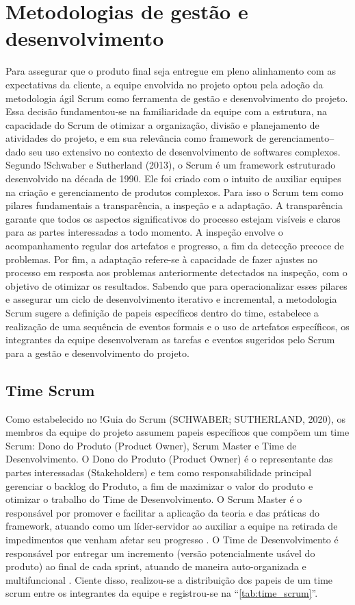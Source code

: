 \documentclass[
	12pt,				%
	openany,			%
	twoside,			%
	a4paper,			%
	english,			%
	french,				%
	spanish,			%
	brazil				%
	]{abntex2}
\begin{document}
\section{Metodologias de gestão e desenvolvimento}
Para assegurar que o produto final seja entregue em pleno alinhamento com as expectativas da cliente, a equipe envolvida no projeto optou pela adoção da metodologia ágil Scrum como ferramenta de gestão e desenvolvimento do projeto. Essa decisão fundamentou-se na familiaridade da equipe com a estrutura, na capacidade do Scrum de otimizar a organização, divisão e planejamento de atividades do projeto, e em sua relevância como framework de gerenciamento– dado seu uso extensivo no contexto de desenvolvimento de softwares complexos.
Segundo !Schwaber e Sutherland (2013), o Scrum é um framework estruturado desenvolvido na década de 1990. Ele foi criado com o intuito de auxiliar equipes na criação e gerenciamento de produtos complexos. Para isso o Scrum tem como pilares fundamentais a transparência, a inspeção e a adaptação. A transparência garante que todos os aspectos significativos do processo estejam visíveis e claros para as partes interessadas a todo momento. A inspeção envolve o acompanhamento regular dos artefatos e progresso, a fim da detecção precoce de problemas. Por fim, a adaptação refere-se à capacidade de fazer ajustes no processo  em resposta aos problemas anteriormente detectados na inspeção, com o objetivo de otimizar os resultados.
Sabendo que para operacionalizar esses pilares e assegurar um ciclo de desenvolvimento iterativo e incremental, a metodologia Scrum sugere a definição de papeis específicos dentro do time, estabelece a realização de uma sequência de eventos formais e o uso de artefatos específicos, os integrantes da equipe desenvolveram as tarefas e eventos sugeridos pelo Scrum para a gestão e desenvolvimento do projeto.

\subsection{Time Scrum}
Como estabelecido no !Guia do Scrum (SCHWABER; SUTHERLAND, 2020), os membros da equipe do projeto assumem papeis específicos que compõem um time Scrum: Dono do Produto (Product Owner), Scrum Master e Time de Desenvolvimento. 
O Dono do Produto (Product Owner) é o representante das partes interessadas (Stakeholders) e tem como responsabilidade principal gerenciar o backlog do Produto, a fim de maximizar o valor do produto e otimizar o trabalho do Time de Desenvolvimento. 
O Scrum Master é o responsável por promover e facilitar a aplicação da teoria e das práticas do framework, atuando como um líder-servidor ao auxiliar a equipe na retirada de impedimentos que venham afetar seu progresso . 
O Time de Desenvolvimento é responsável por entregar um incremento (versão potencialmente usável do produto) ao final de cada sprint, atuando de maneira auto-organizada e multifuncional . 
Ciente disso, realizou-se a distribuição dos papeis de um time scrum entre os integrantes da equipe e registrou-se na “\autoref{tab:time_scrum}”.
\end{document}
